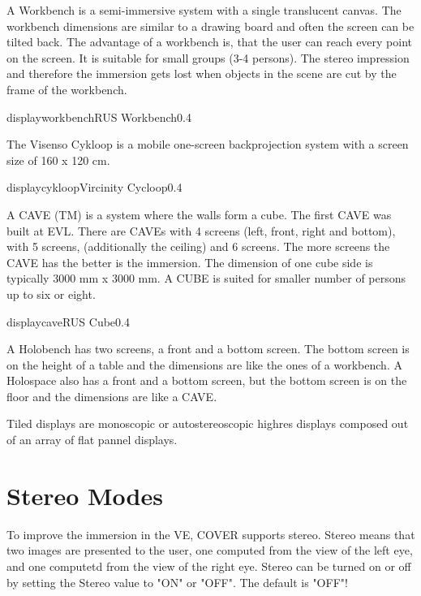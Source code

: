 A Workbench is a semi-immersive system with a single translucent canvas. 
The workbench dimensions are similar to a drawing board and often the screen 
can be tilted back.
The advantage of a workbench is, that
the user can reach every point on the screen. It is suitable for small groups 
(3-4 persons).
The stereo impression and therefore the immersion gets lost when objects 
in the scene are cut by the frame of the workbench.

\begin{covimg}{display}{workbench}{RUS Workbench}{0.4}\end{covimg}

The Visenso Cykloop is a mobile one-screen backprojection system
with a screen size of 160 x 120 cm.

\begin{covimg}{display}{cykloop}{Vircinity Cycloop}{0.4}\end{covimg}

A CAVE (TM) is a system where the walls form a cube. The first CAVE was 
built at EVL. There are CAVEs with 4 screens (left, front, right and bottom), with 5 screens, (additionally the ceiling)
and 6 screens. The more screens the CAVE has the better is the immersion. The dimension of
one cube side is typically 3000 mm x 3000 mm. A CUBE is suited for smaller number of persons up to six or eight.

\begin{covimg}{display}{cave}{RUS Cube}{0.4}\end{covimg}

A Holobench has two screens, a front and a bottom screen.
The bottom screen is on the height of a table and the dimensions are like the 
ones of a workbench.
A Holospace also has a front and a bottom screen, but the bottom screen
is on the floor and the dimensions are like a CAVE.

Tiled displays are monoscopic or autostereoscopic highres displays composed out of an array of flat pannel displays.


\section{Stereo Modes}
\label{label_section_stereo_modes}

To improve the immersion in the VE, COVER supports stereo. Stereo means
that two images are presented to the user, one computed from the
view of the left eye, and one computetd from the view of the right eye.
Stereo can be turned on or off by setting the Stereo value to "ON" or "OFF". The default is "OFF"!

